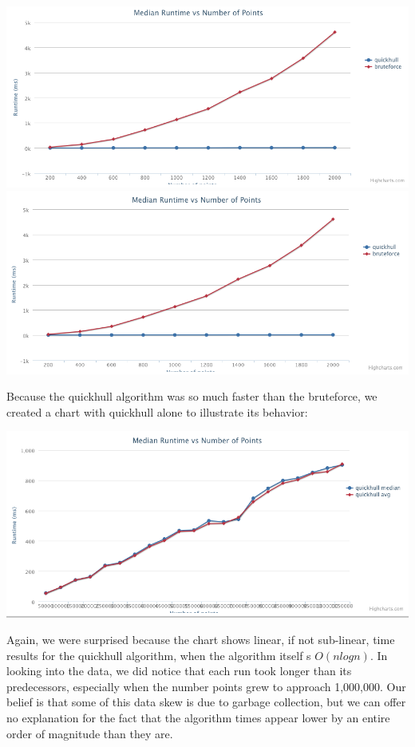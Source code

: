 \documentclass[11pt]{article}
\begin{document}
\includegraphics[scale=0.3]{quickhull - raphael-cloud.png} 
\includegraphics[scale=0.3]{quickhull - raphael-circle.png} 

Because the quickhull algorithm was so much faster than the bruteforce, we created a chart with quickhull alone to illustrate its behavior:

\includegraphics[scale=0.3]{quickhull - qh only.png} 

Again, we were surprised because the chart shows linear, if not sub-linear, time results for the quickhull algorithm, when the algorithm itself s $O(n log n)$. In looking into the data, we did notice that each run took longer than its predecessors, especially when the number points grew to approach 1,000,000. Our belief is that some of this data skew is due to garbage collection, but we can offer no explanation for the fact that the algorithm times appear lower by an entire order of magnitude than they are.
\end{document}
